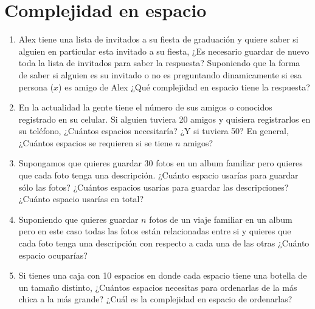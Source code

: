 \documentclass[12pt]{article} %
\begin{document}
\section{Complejidad en espacio}
\begin{enumerate}
\item  Alex tiene una lista de invitados a su fiesta de graduación y quiere saber si alguien en particular esta invitado a su fiesta, ¿Es necesario guardar de nuevo toda la lista de invitados para saber la respuesta?
Suponiendo que la forma de saber si alguien es su invitado o no es preguntando dinamicamente si esa persona ($x$) es amigo de Alex ¿Qué complejidad en espacio tiene la respuesta?
\item En la actualidad la gente tiene el número de sus amigos o conocidos registrado en su celular. Si alguien tuviera 20 amigos y quisiera registrarlos en su teléfono, ¿Cuántos espacios necesitaría? ¿Y si tuviera 50? 
En general, ¿Cuántos espacios se requieren si se tiene $n$ amigos?
\item Supongamos que quieres guardar 30 fotos en un album familiar pero quieres que cada foto tenga una descripción. ¿Cuánto espacio usarías para guardar sólo las fotos? ¿Cuántos espacios usarías para guardar las descripciones? ¿Cuánto espacio usarías en total?
\item Suponiendo que quieres guardar $n$ fotos de un viaje familiar en un album pero en este caso todas las fotos están relacionadas entre si y quieres que cada foto tenga una descripción con respecto a cada una de las otras ¿Cuánto espacio ocuparías?
\item Si tienes una caja con 10 espacios en donde cada espacio tiene una botella de un tamaño distinto, ¿Cuántos espacios necesitas para ordenarlas de la más chica a la más grande? ¿Cuál es la complejidad en espacio de ordenarlas?
\end{enumerate}
\end{document}
